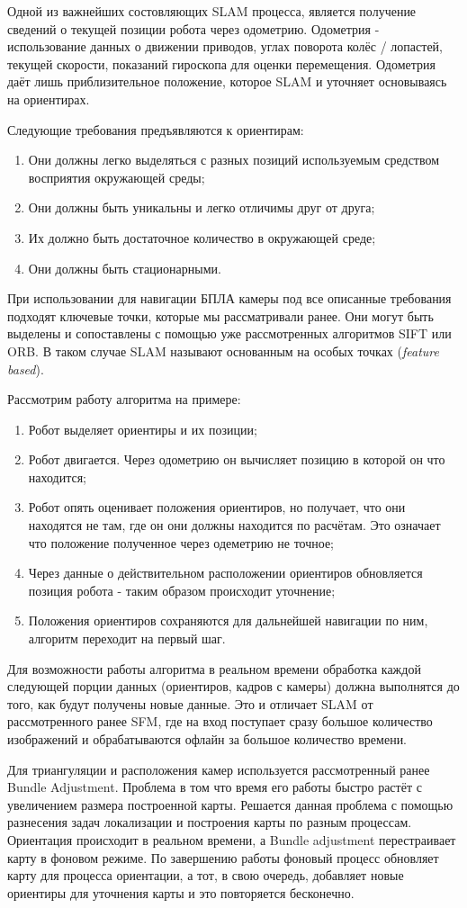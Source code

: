 Одной из важнейших состовляющих SLAM процесса, является получение сведений о текущей позиции робота через одометрию. Одометрия - использование данных о движении приводов, углах поворота колёс / лопастей, текущей скорости, показаний гироскопа для оценки перемещения. Одометрия даёт лишь приблизительное положение, которое SLAM и уточняет основываясь на ориентирах.

Следующие требования предъявляются к ориентирам:
\begin{enumerate}
    \item Они должны легко выделяться с разных позиций используемым средством восприятия окружающей среды;
    \item Они должны быть уникальны и легко отличимы друг от друга;
    \item Их должно быть достаточное количество в окружающей среде;
    \item Они должны быть стационарными.
\end{enumerate}

При использовании для навигации БПЛА камеры под все описанные требования подходят ключевые точки, которые мы рассматривали ранее. Они могут быть выделены и сопоставлены с помощью уже рассмотренных алгоритмов SIFT или ORB. В таком случае SLAM называют основанным на особых точках (\textit{feature based}).

Рассмотрим работу алгоритма на примере:
\begin{enumerate}
    \item Робот выделяет ориентиры и их позиции;
    \item Робот двигается. Через одометрию он вычисляет позицию в которой он  что находится;
    \item Робот опять оценивает положения ориентиров, но получает, что они находятся не там, где он  они должны находится по расчётам. Это означает что положение полученное через одеметрию не точное;
    \item Через данные о действительном расположении ориентиров обновляется позиция робота - таким образом происходит уточнение;
    \item Положения ориентиров сохраняются для дальнейшей навигации по ним, алгоритм переходит на первый шаг.
\end{enumerate}

Для возможности работы алгоритма в реальном времени обработка каждой следующей порции данных (ориентиров, кадров с камеры) должна выполнятся до того, как будут получены новые данные. Это и отличает SLAM от рассмотренного ранее SFM, где на вход поступает сразу большое количество изображений и обрабатываются офлайн за большое количество времени.

Для триангуляции и расположения камер используется рассмотренный ранее Bundle Adjustment. Проблема в том что время его работы быстро растёт с увеличением размера построенной карты. Решается данная проблема с помощью разнесения задач локализации и построения карты по разным процессам. Ориентация происходит в реальном времени, а Bundle adjustment перестраивает карту в фоновом режиме. По завершению работы фоновый процесс обновляет карту для процесса ориентации, а тот, в свою очередь, добавляет новые ориентиры для уточнения карты и это повторяется бесконечно.
